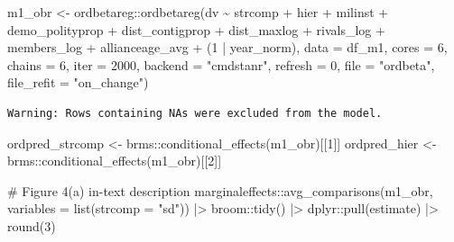 \documentclass[
  12,
  letterpaper,
  DIV=11,
  numbers=noendperiod]{scrartcl}
\newenvironment{Shaded}{\begin{snugshade}}{\end{snugshade}}
\newcommand{\AttributeTok}[1]{\textcolor[rgb]{0.40,0.45,0.13}{#1}}
\newcommand{\CommentTok}[1]{\textcolor[rgb]{0.37,0.37,0.37}{#1}}
\newcommand{\DecValTok}[1]{\textcolor[rgb]{0.68,0.00,0.00}{#1}}
\newcommand{\FunctionTok}[1]{\textcolor[rgb]{0.28,0.35,0.67}{#1}}
\newcommand{\NormalTok}[1]{\textcolor[rgb]{0.00,0.23,0.31}{#1}}
\newcommand{\OtherTok}[1]{\textcolor[rgb]{0.00,0.23,0.31}{#1}}
\newcommand{\SpecialCharTok}[1]{\textcolor[rgb]{0.37,0.37,0.37}{#1}}
\newcommand{\StringTok}[1]{\textcolor[rgb]{0.13,0.47,0.30}{#1}}
\begin{document}
\begin{Shaded}
\begin{Highlighting}[numbers=left,,]
\NormalTok{m1\_obr }\OtherTok{\textless{}{-}}\NormalTok{ ordbetareg}\SpecialCharTok{::}\FunctionTok{ordbetareg}\NormalTok{(dv }\SpecialCharTok{\textasciitilde{}} 
\NormalTok{                                   strcomp }\SpecialCharTok{+}\NormalTok{ hier }\SpecialCharTok{+} 
\NormalTok{                                   milinst }\SpecialCharTok{+}\NormalTok{ demo\_polityprop }\SpecialCharTok{+}\NormalTok{ dist\_contigprop }\SpecialCharTok{+}\NormalTok{ dist\_maxlog }\SpecialCharTok{+}\NormalTok{ rivals\_log }\SpecialCharTok{+}\NormalTok{ members\_log }\SpecialCharTok{+}\NormalTok{ allianceage\_avg }\SpecialCharTok{+}
\NormalTok{                                   (}\DecValTok{1} \SpecialCharTok{|}\NormalTok{ year\_norm),}
                                 \AttributeTok{data =}\NormalTok{ df\_m1,}
                                 \AttributeTok{cores =} \DecValTok{6}\NormalTok{,}
                                 \AttributeTok{chains =} \DecValTok{6}\NormalTok{,}
                                 \AttributeTok{iter =} \DecValTok{2000}\NormalTok{,}
                                 \AttributeTok{backend =} \StringTok{"cmdstanr"}\NormalTok{,}
                                 \AttributeTok{refresh =} \DecValTok{0}\NormalTok{,}
                                 \AttributeTok{file =} \StringTok{"ordbeta"}\NormalTok{,}
                                 \AttributeTok{file\_refit =} \StringTok{"on\_change"}\NormalTok{)}
\end{Highlighting}
\end{Shaded}

\begin{verbatim}
Warning: Rows containing NAs were excluded from the model.
\end{verbatim}

\begin{Shaded}
\begin{Highlighting}[numbers=left,,]
\NormalTok{ordpred\_strcomp }\OtherTok{\textless{}{-}}\NormalTok{ brms}\SpecialCharTok{::}\FunctionTok{conditional\_effects}\NormalTok{(m1\_obr)[[}\DecValTok{1}\NormalTok{]]}
\NormalTok{ordpred\_hier }\OtherTok{\textless{}{-}}\NormalTok{ brms}\SpecialCharTok{::}\FunctionTok{conditional\_effects}\NormalTok{(m1\_obr)[[}\DecValTok{2}\NormalTok{]]}

\CommentTok{\# Figure 4(a) in{-}text description}
\NormalTok{marginaleffects}\SpecialCharTok{::}\FunctionTok{avg\_comparisons}\NormalTok{(m1\_obr, }\AttributeTok{variables =} \FunctionTok{list}\NormalTok{(}\AttributeTok{strcomp =} \StringTok{"sd"}\NormalTok{)) }\SpecialCharTok{|\textgreater{}}\NormalTok{ broom}\SpecialCharTok{::}\FunctionTok{tidy}\NormalTok{() }\SpecialCharTok{|\textgreater{}}\NormalTok{ dplyr}\SpecialCharTok{::}\FunctionTok{pull}\NormalTok{(estimate) }\SpecialCharTok{|\textgreater{}} \FunctionTok{round}\NormalTok{(}\DecValTok{3}\NormalTok{)}
\end{Highlighting}
\end{Shaded}
\end{document}
